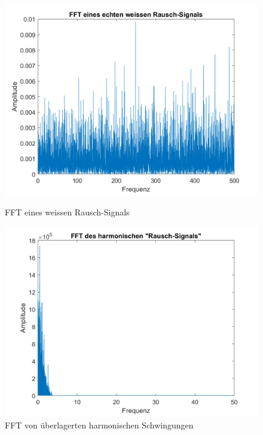 \begin{figure}
		\begin{minipage}{0.45\textwidth}
		\centering
		\includegraphics[width=\linewidth]{papers/brown/images/FFTweissesRauschen.png}
		\caption{FFT eines weissen Rausch-Signals}
		\label{FFTweissesRauschen}
	\end{minipage}
	\hspace{0.05\linewidth}
	\begin{minipage}{0.45\textwidth}
		\centering
		\includegraphics[width=\linewidth]{papers/brown/images/FFT-ueberlagerteSchwingungen.png}
		\caption{FFT von überlagerten harmonischen Schwingungen}
		\label{FFTüberlagerteSchwingungen}
	\end{minipage}
\end{figure}


